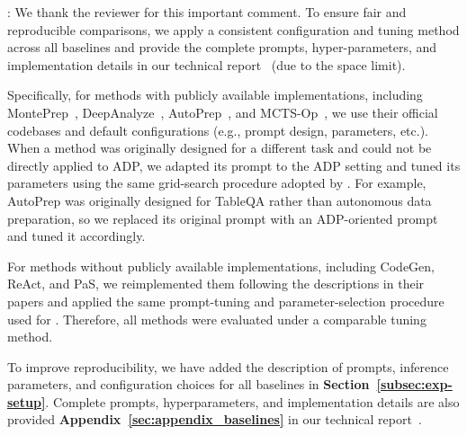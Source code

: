 : 
We thank the reviewer for this important comment.
To ensure fair and reproducible comparisons, we apply a consistent configuration and tuning method across all baselines and provide the complete prompts, hyper-parameters, and implementation details in {our technical report~\cite{technical_report} (due to the space limit).}

Specifically, for methods with publicly available implementations, including MontePrep~\cite{ge2025monteprep}, DeepAnalyze~\cite{zhang2025deepanalyze}, AutoPrep~\cite{fan2024autoprep}, and MCTS-Op~\cite{li2025alphasql}, we use their official codebases and default configurations (e.g., prompt design, parameters, etc.). 
When a method was originally designed for a different task and could not be directly applied to ADP, we adapted its prompt to the ADP setting and tuned its parameters using the same grid-search procedure adopted by \sys. For example, AutoPrep was originally designed for TableQA rather than autonomous data preparation, so we replaced its original prompt with an ADP-oriented prompt and tuned it accordingly.

For methods without publicly available implementations, including CodeGen, ReAct, and PaS, we reimplemented them following the descriptions in their papers and applied the same prompt-tuning and parameter-selection procedure used for \sys. Therefore, all methods were evaluated under a comparable tuning method.


To improve reproducibility, we have added the description of prompts, inference parameters, and configuration choices for all baselines in \textbf{Section~\ref{subsec:exp-setup}}. Complete prompts, hyperparameters, and implementation details are also provided \textbf{Appendix~\ref{sec:appendix_baselines}} in our technical report~\cite{technical_report}.


